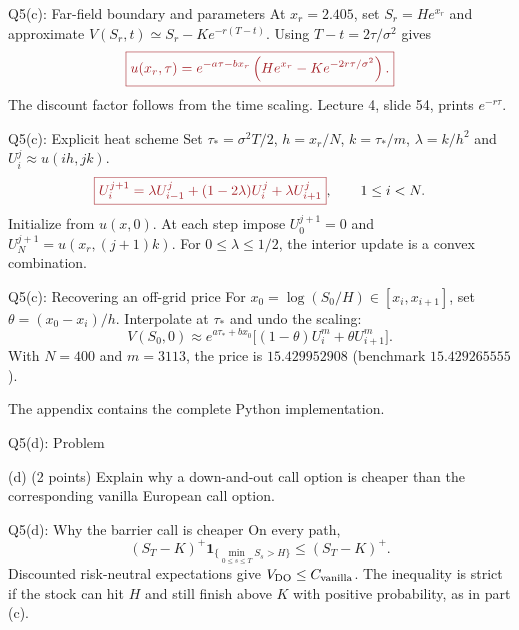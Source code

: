 \documentclass{beamer}
\newcommand{\keymath}[1]{\textcolor{lecturekey}{#1}}
\newcommand{\keybox}[1]{\keymath{\boxed{#1}}}
\newcommand{\keytext}[1]{\textcolor{lecturekey}{\textbf{#1}}}
\begin{document}
\begin{frame}{Q5(c): Far-field boundary and parameters}
\small
At $x_r=2.405$, set $S_r=He^{x_r}$ and approximate
$V(S_r,t)\simeq S_r-Ke^{-r(T-t)}$. Using $T-t=2\tau/\sigma^2$ gives
\[
\keybox{u(x_r,\tau)=e^{-a\tau-bx_r}
\left(He^{x_r}-Ke^{-2r\tau/\sigma^2}\right).}
\]
\footnotesize
The discount factor follows from the time scaling. Lecture 4, slide 54,
prints $e^{-r\tau}$.
\end{frame}

\begin{frame}{Q5(c): Explicit heat scheme}
\small
Set $\tau_*=\sigma^2T/2$, $h=x_r/N$, $k=\tau_*/m$, $\lambda=k/h^2$ and
$U_i^j\approx u(ih,jk)$.
\[
\keybox{U_i^{j+1}=\lambda U_{i-1}^j+(1-2\lambda)U_i^j+\lambda U_{i+1}^j},
\qquad 1\leq i<N.
\]
Initialize from $u(x,0)$. At each step impose
$U_0^{j+1}=0$ and $U_N^{j+1}=u(x_r,(j+1)k)$.
For \keytext{$0\leq\lambda\leq1/2$}, the interior update is a convex combination.
\end{frame}

\begin{frame}{Q5(c): Recovering an off-grid price}
\small
For $x_0=\log(S_0/H)\in[x_i,x_{i+1}]$, set $\theta=(x_0-x_i)/h$.
Interpolate at $\tau_*$ and undo the scaling:
\[
V(S_0,0)\approx
e^{a\tau_*+bx_0}\big[(1-\theta)U_i^m+\theta U_{i+1}^m\big].
\]
With $N=400$ and $m=3113$, the price is \keytext{$15.429952908$}
(benchmark $15.429265555$).

\medskip
The appendix contains the complete Python implementation.
\end{frame}

\begin{frame}{Q5(d): Problem}
\footnotesize
\setlength{\abovedisplayskip}{5pt}
\setlength{\belowdisplayskip}{5pt}
\begin{block}{(d) \hfill (2 points)}
Explain why a down-and-out call option is cheaper than the corresponding
vanilla European call option.
\end{block}
\end{frame}

\begin{frame}{Q5(d): Why the barrier call is cheaper}
\small
On every path,
\[
(S_T-K)^+\mathbf 1_{\{\min_{0\leq s\leq T}S_s>H\}}\leq (S_T-K)^+.
\]
Discounted risk-neutral expectations give $V_{\rm DO}\leq C_{\rm vanilla}$.
The inequality is strict if the stock can hit $H$ and still finish
above $K$ with positive probability, as in part (c).
\end{frame}
\end{document}
